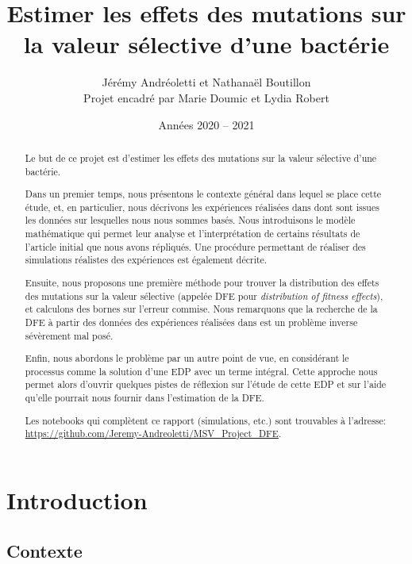\documentclass[12pt]{article}
\title{Estimer les effets des mutations sur la valeur sélective d'une bactérie}
\author{Jérémy Andréoletti et Nathanaël Boutillon\\Projet encadré par Marie Doumic et Lydia Robert}
\date{Années 2020 -- 2021}
\newcounter{prop}[section]
\begin{document}
\maketitle

\begin{abstract}
  Le but de ce projet est d'estimer les effets des mutations sur la valeur sélective d'une bactérie.

  Dans un premier temps, nous présentons le contexte général dans lequel se place cette étude, et, en particulier, nous décrivons les expériences réalisées dans \cite{rob} dont sont issues les données sur lesquelles nous nous sommes basés. Nous introduisons le modèle mathématique qui permet leur analyse et l'interprétation de certains résultats de l'article initial que nous avons répliqués. Une procédure permettant de réaliser des simulations réalistes des expériences est également décrite.

  Ensuite, nous proposons une première méthode pour trouver la distribution des effets des mutations sur la valeur sélective (appelée DFE pour \emph{distribution of fitness effects}), et calculons des bornes sur l'erreur commise. Nous remarquons que la recherche de la DFE à partir des données des expériences réalisées dans \cite{rob} est un problème inverse sévèrement mal posé.

  Enfin, nous abordons le problème par un autre point de vue, en considérant le processus comme la solution d'une EDP avec un terme intégral. Cette approche nous permet alors d'ouvrir quelques pistes de réflexion sur l'étude de cette EDP et sur l'aide qu'elle pourrait nous fournir dans l'estimation de la DFE.

  Les notebooks qui complètent ce rapport (simulations, etc.) sont trouvables à l'adresse: \url{https://github.com/Jeremy-Andreoletti/MSV_Project_DFE}.

\end{abstract}

\newpage

\tableofcontents

\newpage

\FloatBarrier
\section{Introduction}

\subsection{Contexte}
\end{document}
